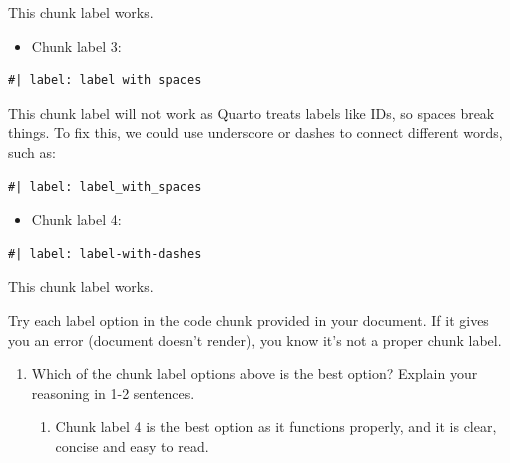\documentclass[
  letterpaper,
  DIV=11,
  numbers=noendperiod]{scrartcl}
\providecommand{\tightlist}{%
  \setlength{\itemsep}{0pt}\setlength{\parskip}{0pt}}
\begin{document}
This chunk label works.

\begin{itemize}
\tightlist
\item
  Chunk label 3:
\end{itemize}

\begin{verbatim}
#| label: label with spaces
\end{verbatim}

This chunk label will not work as Quarto treats labels like IDs, so
spaces break things. To fix this, we could use underscore or dashes to
connect different words, such as:

\begin{verbatim}
#| label: label_with_spaces
\end{verbatim}

\begin{itemize}
\tightlist
\item
  Chunk label 4:
\end{itemize}

\begin{verbatim}
#| label: label-with-dashes
\end{verbatim}

This chunk label works.

\begin{tcolorbox}[enhanced jigsaw, coltitle=black, colbacktitle=quarto-callout-tip-color!10!white, colframe=quarto-callout-tip-color-frame, breakable, leftrule=.75mm, bottomtitle=1mm, left=2mm, opacityback=0, toptitle=1mm, titlerule=0mm, bottomrule=.15mm, title=\textcolor{quarto-callout-tip-color}{\faLightbulb}\hspace{0.5em}{Tip}, arc=.35mm, colback=white, opacitybacktitle=0.6, rightrule=.15mm, toprule=.15mm]

Try each label option in the code chunk provided in your document. If it
gives you an error (document doesn't render), you know it's not a proper
chunk label.

\end{tcolorbox}

\begin{enumerate}
\def\labelenumi{\alph{enumi}.}
\item
  Which of the chunk label options above is the best option? Explain
  your reasoning in 1-2 sentences.

  \begin{enumerate}
  \def\labelenumii{\alph{enumii}.}
  \tightlist
  \item
    Chunk label 4 is the best option as it functions properly, and it is
    clear, concise and easy to read.
  \end{enumerate}
\end{enumerate}
\end{document}
